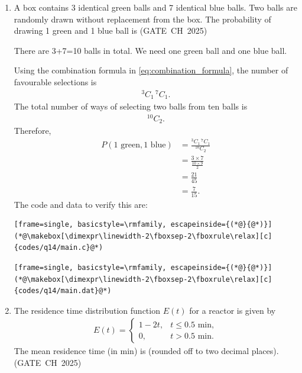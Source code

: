 \begin{enumerate}[label=\thesubsection.\arabic*, ref=\thesubsection.\theenumi,itemsep=0pt]
\item A box contains 3 identical green balls and 7 identical blue balls. Two balls are randomly drawn without replacement from the box. The probability of drawing 1 green and 1 blue ball is \hfill (GATE~CH~2025)
\begin{enumerate}[itemsep=0pt]
\end{enumerate}

\solution There are 3+7=10 balls in total. We need one green ball and one blue ball.

Using the combination formula in \eqref{eq:combination_formula}, the number of favourable selections is
\begin{align}
{}^3C_1\,{}^7C_1.
\end{align}
The total number of ways of selecting two balls from ten balls is
\begin{align}
{}^{10}C_2.
\end{align}
Therefore,
\begin{align}
P(1\text{ green},1\text{ blue})
&=\frac{{}^3C_1\,{}^7C_1}{{}^{10}C_2}\\
&=\frac{3\times7}{\frac{10\times9}{2}}\\
&=\frac{21}{45}\\
&=\frac{7}{15}.
\end{align}
The code and data to verify this are:
\begin{lstlisting}[frame=single, basicstyle=\rmfamily, escapeinside={(*@}{@*)}]
(*@\makebox[\dimexpr\linewidth-2\fboxsep-2\fboxrule\relax][c]{codes/q14/main.c}@*)
\end{lstlisting}

\begin{lstlisting}[frame=single, basicstyle=\rmfamily, escapeinside={(*@}{@*)}]
(*@\makebox[\dimexpr\linewidth-2\fboxsep-2\fboxrule\relax][c]{codes/q14/main.dat}@*)
\end{lstlisting}

\item The residence time distribution function $E(t)$ for a reactor is given by
\begin{align}
E(t)=\begin{cases}
1-2t, & t\leq0.5\text{ min},\\
0, & t>0.5\text{ min}.
\end{cases}
\end{align}
The mean residence time (in min) is \underline{\hspace{2cm}} (rounded off to two decimal places). \hfill (GATE~CH~2025)


\end{enumerate}
